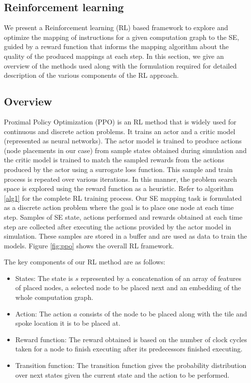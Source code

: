 \subsection{Reinforcement learning}

We present a Reinforcement learning (RL) based framework to explore and optimize the mapping of instructions for a given computation graph to the SE, guided by a reward function that informs the mapping algorithm about the quality of the produced mappings at each step. In this section, we give an overview of the methods used along with the formulation required for detailed description of the various components of the RL approach.

\subsection{Overview}
Proximal Policy Optimization (PPO) \cite{schulman2017proximal} is an RL method that is  widely used for continuous and discrete action problems. 
It trains an actor and a critic model (represented as neural networks).
The actor model is trained to produce actions (node placements in our case) from sample states obtained during simulation and the critic model is trained to match the sampled rewards from the actions produced by the actor using a surrogate loss function. 
This sample and train process is repeated over various iterations. 
In this manner, the problem search space is explored using the reward function as a heuristic.
Refer to algorithm \ref{alg1} for the complete RL training process.
Our SE mapping task is formulated as a discrete action problem where the goal is to place one node at each time step. 
Samples of SE state, actions performed and rewards obtained at each time step are collected after executing the actions provided by the actor model in simulation. 
These samples are stored in a buffer and are used as data to train the models.
Figure \ref{fig:ppo} shows the overall RL framework. 

The key components of our RL method are as follows:
\begin{itemize}
  \item States: The state is $s$ represented by a concatenation of an array of features of placed nodes, a selected node to be placed next and an embedding of the whole computation graph. 
  \item Action: The action $a$ consists of the node to be placed along with the tile and spoke location it is to be placed at.
  \item Reward function: The reward obtained is based on the number of clock cycles taken for a node to finish executing after its predecessors finished executing.
  \item Transition function: The transition function gives the probability distribution over next states given the current state and the action to be performed.
\end{itemize}

